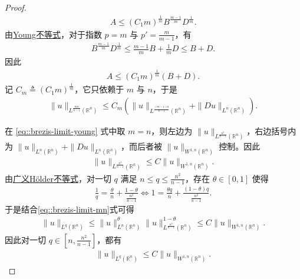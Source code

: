 \documentclass[../../main.tex]{subfiles}
\begin{document}
\begin{proof}
\begin{align*}
A \leqslant (C_1 m)^{\frac{1}{m}} B^{\frac{m-1}{m}} D^{\frac{1}{m}}.
\end{align*}
由\hyperref[Basis of Analytics-theorem:Young不等式]{Young不等式}，对于指数 $p=m$ 与 $p'=\frac{m}{m-1}$，有
\begin{align*}
B^{\frac{m-1}{m}} D^{\frac{1}{m}} \leqslant \frac{m-1}{m}B + \frac{1}{m}D \leqslant B + D.
\end{align*}
因此
\begin{align*}
A \leqslant (C_1 m)^{\frac{1}{m}} (B + D).
\end{align*}
记 $C_m\triangleq(C_1 m)^{\frac{1}{m}}$，它只依赖于 $m$ 与 $n$，于是
\begin{align}\label{eq::brezis-limit-young}
\|u\|_{L^{\frac{mn}{n-1}}(\mathbb{R}^n)} \leqslant C_m\left(\|u\|_{L^{\frac{(m-1)n}{n-1}}(\mathbb{R}^n)} + \|Du\|_{L^n(\mathbb{R}^n)}\right).
\end{align}

在 \eqref{eq::brezis-limit-young} 式中取 $m=n$，则左边为 $\|u\|_{L^{\frac{n^2}{n-1}}(\mathbb{R}^n)}$，右边括号内为 $\|u\|_{L^n(\mathbb{R}^n)} + \|Du\|_{L^n(\mathbb{R}^n)}$，而后者被 $\|u\|_{W^{1,n}(\mathbb{R}^n)}$ 控制。因此
\begin{align}\label{eq::brezis-limit-mn}
\|u\|_{L^{\frac{n^2}{n-1}}(\mathbb{R}^n)} \leqslant C\|u\|_{W^{1,n}(\mathbb{R}^n)}.
\end{align}
由\hyperref[theorem:广义Holder不等式]{广义Hölder不等式}，对一切 $q$ 满足 $n \leqslant q \leqslant \frac{n^2}{n-1}$，存在 $\theta \in [0,1]$ 使得
\begin{align*}
\frac{1}{q} = \frac{\theta}{n} + \frac{1-\theta}{\frac{n^2}{n-1}} \iff 1= \frac{\theta q}{n} + \frac{(1-\theta)q}{\frac{n^2}{n-1}}.
\end{align*}
于是结合\eqref{eq::brezis-limit-mn}式可得
\begin{align*}
\|u\|_{L^q(\mathbb{R}^n)}
\leqslant \|u\|_{L^n(\mathbb{R}^n)}^\theta \|u\|_{L^{\frac{n^2}{n-1}}(\mathbb{R}^n)}^{1-\theta}
\leqslant C\|u\|_{W^{1,n}(\mathbb{R}^n)}.
\end{align*}
因此对一切 $q \in \left[n, \frac{n^2}{n-1}\right]$，都有
\begin{align}\label{eq::brezis-limit-interpolation}
\|u\|_{L^q(\mathbb{R}^n)} \leqslant C\|u\|_{W^{1,n}(\mathbb{R}^n)}.
\end{align}


\end{proof}
\end{document}
